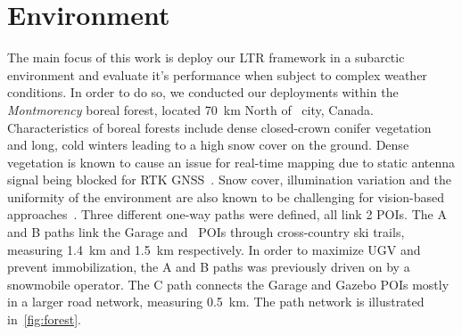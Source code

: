 \section{Environment}
\label{sec:env}

The main focus of this work is deploy our \ac{LTR} framework in a subarctic environment and evaluate it's performance when subject to complex weather conditions.
In order to do so, we conducted our deployments within the \textit{Montmorency} boreal forest, located \SI{70}{km} North of \quebec~city, Canada.
Characteristics of boreal forests include dense closed-crown conifer vegetation~\citep{Russell1988} and long, cold winters leading to a high snow cover on the ground.
Dense vegetation is known to cause an issue for real-time mapping due to static antenna signal being blocked for \ac{RTK} \ac{GNSS}~\citep{Babin2019}.
Snow cover, illumination variation and the uniformity of the environment are also known to be challenging for vision-based approaches~\citep{Paton2017}.
Three different one-way paths were defined, all link 2 \acp{POI}.
The A  and B paths link the Garage and \laverdiere~\acp{POI} through cross-country ski trails, measuring \SI{1.4}{km} and \SI{1.5}{km} respectively.
In order to maximize \ac{UGV} and prevent immobilization, the A and B paths was previously driven on by a snowmobile operator.
The C path connects the Garage and Gazebo \acp{POI} mostly in a larger road network, measuring \SI{0.5}{km}.
The path network is illustrated in~\autoref{fig:forest}.

